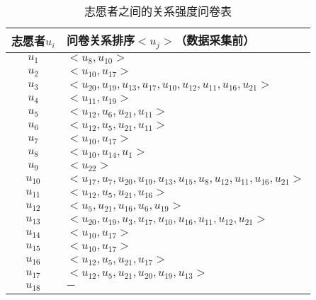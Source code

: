 \begin{table}[htb]
\wuhao
  \centering
  \begin{minipage}[t]{0.8\linewidth} %
  \caption[志愿者的关系强度问卷表]{志愿者之间的关系强度问卷表}
  \label{tab:truthresult}
    \begin{tabular*}{\linewidth}{cp{10cm}}
      \toprule[1.5pt]
      {志愿者\mbox{$u_{i}$}} & {问卷关系排序\mbox{$<u_{j}>$}（数据采集前）}  \\
      \midrule[1pt]
      \mbox{$u_{1}$} & \mbox{$<u_{8},u_{10}>$}  \\
      \hline
      \mbox{$u_{2}$} & \mbox{$<u_{10},u_{17}>$}  \\ 
      \hline
      \mbox{$u_{3} $}&\mbox{$ <u_{20},u_{19},u_{13},u_{17},u_{10},u_{12},u_{11},u_{16},u_{21}>$}\\
      \hline
      \mbox{$u_{4}$} & \mbox{$<u_{11},u_{19}>$}\\
      \hline
      \mbox{$u_{5} $}& \mbox{$<u_{12},u_{6},u_{21},u_{11}>$}\\
      \hline
      \mbox{$u_{6}$} & \mbox{$<u_{12},u_{5},u_{21},u_{11}>$}\\
      \hline
      \mbox{$u_{7}$} & \mbox{$<u_{10},u_{17}>$}\\
      \hline
      \mbox{$u_{8}$} &\mbox{$ <u_{10},u_{14},u_{1}>$}\\
      \hline
      \mbox{$u_{9} $}& \mbox{$<u_{22}>$}\\
      \hline
      \mbox{$u_{10} $}& \mbox{$<u_{17},u_{7},u_{20},u_{19},u_{13},u_{15},u_{8},u_{12},u_{11},u_{16},u_{21}>$}\\
      \hline
      \mbox{$u_{11} $}&  \mbox{$<u_{12},u_{5},u_{21},u_{16}>$}\\
      \hline
      \mbox{$u_{12} $}& \mbox{$ <u_{5},u_{21},u_{16},u_{6},u_{19}>$}\\
      \hline
      \mbox{$u_{13}$} &\mbox{$ <u_{20},u_{19},u_{3},u_{17},u_{10},u_{16},u_{11},u_{12},u_{21}>$}\\
      \hline
      \mbox{$u_{14}$} &\mbox{$ <u_{10},u_{17} >$}\\
      \hline
      \mbox{$u_{15}$} & \mbox{$<u_{10},u_{17}>$}\\
      \hline
      \mbox{$u_{16}$} &\mbox{$ <u_{12},u_{5},u_{21},u_{17}>$}\\
      \hline
      \mbox{$u_{17} $}& \mbox{$< u_{12},u_{5},u_{21},u_{20},u_{19},u_{13}   >$}\\
      \hline
      \mbox{$u_{18} $}&\mbox{$ -$}\\

\end{tabular*}
\end{minipage}
\end{table}
